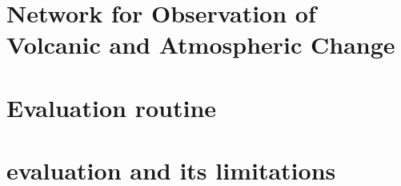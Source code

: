 \documentclass  [
  paper    = a4,
  BCOR     = 10mm,
  twoside,
  fontsize = 12pt,
  fleqn,
  toc      = bibnumbered,
  toc      = listofnumbered,
  numbers  = noendperiod,
  headings = normal,
  listof   = leveldown,
  version  = 3.03
]                                       {scrreprt}
\begin{document}
	
	\chapter{Network for Observation of Volcanic and Atmospheric Change \label{NOVAC}}
	
	
	\chapter{Evaluation routine}
	
	\chapter{  evaluation and its limitations}
	
	
\end{document}
